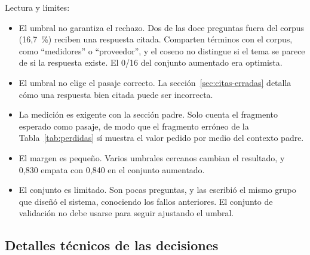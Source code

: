 Lectura y límites:
\begin{itemize}
  \item El umbral no garantiza el rechazo. Dos de las doce preguntas fuera del corpus (16,7~\%) reciben una respuesta citada. Comparten términos con el corpus, como ``medidores'' o ``proveedor'', y el coseno no distingue si el tema se parece de si la respuesta existe. El 0/16 del conjunto aumentado era optimista.
  \item El umbral no elige el pasaje correcto. La sección~\ref{sec:citas-erradas} detalla cómo una respuesta bien citada puede ser incorrecta.
  \item La medición es exigente con la sección padre. Solo cuenta el fragmento esperado como pasaje, de modo que el fragmento erróneo de la Tabla~\ref{tab:perdidas} sí muestra el valor pedido por medio del contexto padre.
  \item El margen es pequeño. Varios umbrales cercanos cambian el resultado, y 0,830 empata con 0,840 en el conjunto aumentado.
  \item El conjunto es limitado. Son pocas preguntas, y las escribió el mismo grupo que diseñó el sistema, conociendo los fallos anteriores. El conjunto de validación no debe usarse para seguir ajustando el umbral.
\end{itemize}

\subsection{Detalles técnicos de las decisiones}

